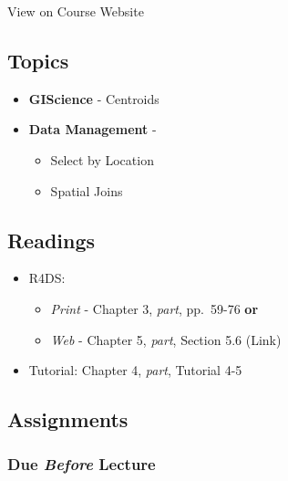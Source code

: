 \documentclass[
]{book}
\providecommand{\tightlist}{%
  \setlength{\itemsep}{0pt}\setlength{\parskip}{0pt}}
\begin{document}
View on Course Website

\hypertarget{topics-11}{%
\subsection*{Topics}\label{topics-11}}

\begin{itemize}
\tightlist
\item
  \textbf{GIScience} - Centroids
\item
  \textbf{Data Management} -

  \begin{itemize}
  \tightlist
  \item
    Select by Location
  \item
    Spatial Joins
  \end{itemize}
\end{itemize}

\hypertarget{readings-11}{%
\subsection*{Readings}\label{readings-11}}

\begin{itemize}
\tightlist
\item
  R4DS:

  \begin{itemize}
  \tightlist
  \item
    \emph{Print} - Chapter 3, \emph{part}, pp.~59-76 \textbf{or}
  \item
    \emph{Web} - Chapter 5, \emph{part}, Section 5.6 (Link)
  \end{itemize}
\item
  Tutorial: Chapter 4, \emph{part}, Tutorial 4-5
\end{itemize}

\hypertarget{assignments-12}{%
\subsection*{Assignments}\label{assignments-12}}

\hypertarget{due-before-lecture-10}{%
\subsubsection*{\texorpdfstring{Due \emph{Before} Lecture}{Due Before Lecture}}\label{due-before-lecture-10}}
\end{document}
